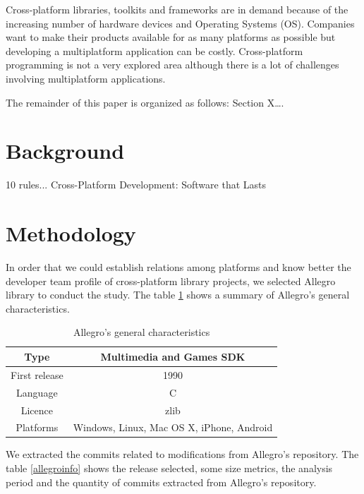 \documentclass[10pt, conference]{IEEEtran}
\begin{document}
Cross-platform libraries, toolkits and frameworks are in demand because of the increasing number of hardware devices and Operating Systems (OS). Companies want to make their products available for as many platforms as possible but developing a multiplatform application can be costly. Cross-platform programming is not a very explored area although there is a lot of challenges involving multiplatform applications.   

The remainder of this paper is organized as follows: Section X…. 

\section{Background}

10 rules...
Cross-Platform Development: Software that Lasts

\section{Methodology}

In order that we could establish relations among platforms and know better the developer team profile of cross-platform library projects, we selected Allegro library to conduct the study. The table \ref{allegrogeneral} shows a summary of Allegro’s general characteristics.  

\begin{table}[h]
\renewcommand{\arraystretch}{1.3}
\caption{Allegro’s general characteristics}
\label{allegrogeneral}
\centering

\begin{tabular}{|c|c|}
\hline
Type & Multimedia and Games SDK \\
\hline
First release & 1990 \\
\hline
Language & C \\
\hline
Licence & zlib \\
\hline
Platforms & Windows, Linux, Mac OS X, iPhone, Android \\
\hline
\end{tabular}
\end{table}

We extracted the commits related to modifications from Allegro's repository. The table \ref{allegroinfo} shows the release selected, some size metrics, the analysis period  and the quantity of commits extracted from Allegro's repository. 
\end{document}
